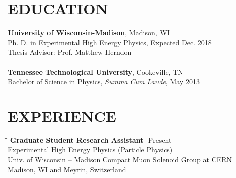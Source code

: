 \documentclass[10pt]{res} %
\begin{document}

\address{{\bf Current Address} \\  CERN 32/4-B03  \\  CH-1211 Geneva 23 \\ Switzerland }
\address{{\bf Permanent Address} \\ 141 County Hill Rd. \\ Blountville,
TN 37617 \\ (423) 323-8326}

\begin{resume}

\section{EDUCATION}
  \textbf{University of Wisconsin-Madison}, Madison, WI \\
Ph. D. in Experimental High Energy Physics, Expected Dec. 2018 \\
Thesis Advisor: Prof. Matthew Herndon \\
\\
  \textbf{Tennessee Technological University}, Cookeville, TN \\
Bachelor of Science in Physics, \textit{Summa Cum Laude}, May 2013 \\

\section{EXPERIENCE}
\vspace{-0.1in}
\begin{tabbing}
\hspace{2.3in}\= \hspace{2.5in}\= \kill %
{\bf Graduate Student Research Assistant} \>-Present \\
Experimental High Energy Physics  (Particle Physics)\\
Univ. of Wisconsin -- Madison Compact Muon Solenoid Group at CERN   \\  Madison, WI and Meyrin, Switzerland \\
\end{tabbing}\vspace{-20pt}      %


\end{resume}
\end{document}
